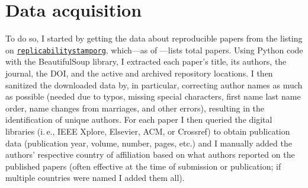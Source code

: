 \documentclass[conference,svgnames]{vgtc}                     %
\newcommand{\ie}{i.\,e.}
\begin{document}
\section{Data acquisition}
\label{sec:data}

To do so, I started by getting the data about reproducible papers from the listing on \href{https://www.replicabilitystamp.org/}{\texttt{replicabilitystamporg}}, which---as of \GrsiDataCurrentAsOf---lists \GrsiTotalPapers{} total papers. Using Python code with the BeautifulSoup library, I extracted each paper's title, its authors, the journal, the DOI, and the active and archived repository locations. I then sanitized the downloaded data by, in particular, correcting author names as much as possible (needed due to typos, missing special characters, first name last name order, name changes from marriages, and other errors), resulting in the identification of \GrsiTotalAuthors{} unique authors. For each paper I then queried the digital libraries (\ie, IEEE Xplore, Elsevier, ACM, or Crossref) to obtain publication data (publication year, volume, number, pages, etc.) and I manually added the authors' respective country of affiliation based on what authors reported on the published papers (often effective at the time of submission or publication; if multiple countries were named I added them all).
\end{document}
